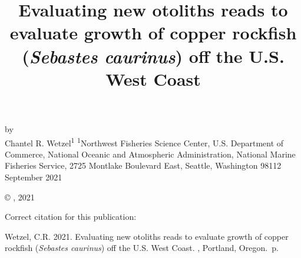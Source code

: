 \documentclass[11pt,
  english,
  a4paper,
]{article}
\date{}
\newcommand{\trTitle}{Evaluating new otoliths reads to evaluate growth of copper rockfish (\emph{Sebastes caurinus}) off the U.S. West Coast}
\newcommand{\trYear}{2021}
\newcommand{\trMonth}{September}
\newcommand{\trAuthsBack}{Wetzel, C.R}
\newcommand{\trCitation}{
\begin{hangparas}{1em}{1}
\trAuthsBack{}. \trYear{}. \trTitle{}. \glsentrylong{pfmc}, Portland, Oregon. \pageref{LastPage}{}\,p.
\end{hangparas}}
\begin{document}

\renewcommand*{\thefootnote}{\fnsymbol{footnote}}

\small
\thispagestyle{empty}
\noindent
\begin{center}
\title{Evaluating new otoliths reads to evaluate growth of copper rockfish (\emph{Sebastes caurinus}) off the U.S. West Coast}
\vspace{1.5cm}
{\Large\textbf{}}
\vfill
by\\
Chantel R. Wetzel\textsuperscript{1}\vfill
\textsuperscript{1}Northwest Fisheries Science Center, U.S. Department of Commerce, National Oceanic and Atmospheric Administration, National Marine Fisheries Service, 2725 Montlake Boulevard East, Seattle, Washington 98112\vfill
\trMonth{} \trYear{}
\end{center}
\clearpage

\thispagestyle{empty}
\vspace*{\fill}
\begin{center}
\copyright{} , \trYear{}\\
\end{center}
\par
\bigskip
\noindent
Correct citation for this publication:
\bigskip
\par
\trCitation{}
\clearpage


\tableofcontents\clearpage
\label{TRlastRoman}
\clearpage

\newpage
\thispagestyle{empty} %

\pagestyle{plain}  %
\renewcommand*{\thefootnote}{\arabic{footnote}}  %
\setcounter{footnote}{0}  %
\renewcommand{\headrulewidth}{0.5pt}
\renewcommand{\footrulewidth}{0.5pt}

\newcommand{\lt}{\ensuremath <}
\newcommand{\gt}{\ensuremath >}
\end{document}
